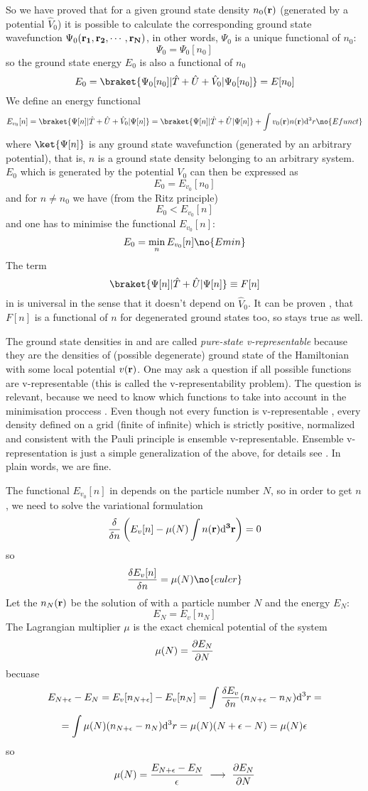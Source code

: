 So we have proved that for a given ground state density $n_0({\bf r})$
(generated by a potential $\hat V_0$)
it is possible to calculate the corresponding ground state wavefunction
$\Psi_0({\bf r_1},{\bf r_2},\cdots,{\bf r_N})$, in other words,
$\Psi_0$ is a unique functional of $n_0$:
$$\Psi_0=\Psi_0[n_0]$$
so the ground state energy $E_0$ is also a functional of $n_0$
$$E_0=\braket{\Psi_0[n_0]|\hat T+\hat U+\hat V_0|\Psi_0[n_0]}=E[n_0]$$
We define an energy functional
$$E_{v_0}[n]=\braket{\Psi[n]|\hat T+\hat U+\hat V_0|\Psi[n]}=
\braket{\Psi[n]|\hat T+\hat U|\Psi[n]}+\int v_0({\bf r})n({\bf r})\d^3r
\no{Efunct}$$
where $\ket{\Psi[n]}$ is any ground state wavefunction (generated by an
arbitrary potential), that is, $n$ is a ground state density belonging to an
arbitrary system. $E_0$ which is generated by the potential $V_0$ can then be
expressed as
$$E_0=E_{v_0}[n_0]$$
and for $n\neq n_0$ we have (from the Ritz principle)
$$E_0<E_{v_0}[n]$$
and one has to minimise the functional $E_{v_0}[n]$:
$$E_0=\min_n E_{v_0}[n]\no{Emin}$$
The term 
$$\braket{\Psi[n]|\hat T+\hat U|\Psi[n]}\equiv F[n]$$
in  is universal in the sense that it doesn't depend on $\hat V_0$.
It can be proven \cite{DFT}, that $F[n]$ is a functional of $n$ for degenerated
ground states too, so  stays true as well.

The ground state densities in  and  are called {\it
pure-state v-representable\/} because they are the densities of (possible
degenerate) ground state of the Hamiltonian with some local potential 
$v({\bf r})$. One may ask a question if all possible functions are
v-representable (this is called the v-representability problem). The question
is relevant, because we need to know which functions to take into account in
the minimisation proccess . Even though not every function is
v-representable \cite{DFT}, every density defined on a grid (finite of
infinite) which is strictly positive, normalized and consistent with the Pauli
principle is ensemble v-representable. Ensemble v-representation is just a
simple generalization of the above, for details see \cite{DFT}. In plain words,
we are fine.

The functional $E_{v_0}[n]$ in  depends on the particle number $N$,
so in order to get $n$, we need to solve the variational formulation
$${\delta\over\delta n}\left(E_v[n]-\mu(N)\int n(\bf r){\rm d}^3r\right)=0$$
so
$${\delta E_v[n]\over\delta n}=\mu(N)\no{euler}$$
Let the $n_N(\bf r)$ be the solution of  with a particle number $N$
and the energy $E_N$:
$$E_N=E_v[n_N]$$
The Lagrangian multiplier $\mu$ is the exact chemical potential of the system
$$\mu(N)={\partial E_N\over\partial N}$$
becuase
$$E_{N+\epsilon}-E_N=E_v[n_{N+\epsilon}]-E_v[n_N]
=\int {\delta E_v\over\delta n} (n_{N+\epsilon}-n_N){\rm d}^3r=
$$
$$=\int \mu(N) (n_{N+\epsilon}-n_N){\rm d}^3r
=\mu(N)(N+\epsilon-N)=\mu(N)\epsilon$$
so
$$\mu(N)={E_{N+\epsilon}-E_N\over\epsilon}
\ \longrightarrow \
{\partial E_N\over\partial N}$$

